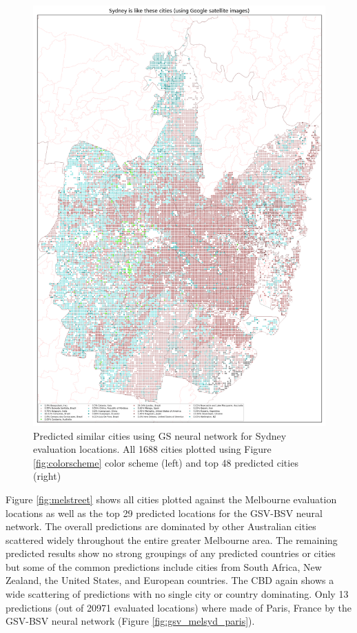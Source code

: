 \documentclass[sageh,times]{sagej}
\begin{document}
\begin{figure}[!htbp]
\includegraphics[scale=0.20]{Images/SydneyOverallAbrev_sat.png} 
\caption{Predicted similar cities using GS neural network for Sydney evaluation locations. All 1688 cities plotted using Figure \ref{fig:colorscheme} color scheme (left) and top 48 predicted cities (right)}    
 \label{fig:sydsat}  
\end{figure} 



Figure \ref{fig:melstreet} shows all cities plotted against the Melbourne evaluation locations as well as the top 29 predicted locations for the GSV-BSV neural network. The overall predictions are dominated by other Australian cities scattered widely throughout the entire greater Melbourne area. The remaining predicted results show no strong groupings of any predicted countries or cities but some of the common predictions include cities from South Africa, New Zealand, the United States, and European countries. The CBD again shows a wide scattering of predictions with no single city or country dominating. Only 13 predictions (out of 20971 evaluated locations) where made of Paris, France by the GSV-BSV neural network (Figure \ref{fig:gsv_melsyd_paris}).
\end{document}
